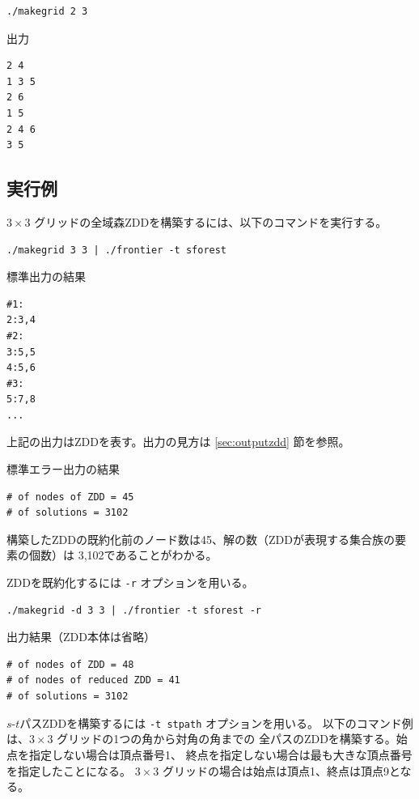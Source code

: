 \documentclass{jsarticle}
\begin{document}
\begin{verbatim}
./makegrid 2 3
\end{verbatim}

出力

\begin{verbatim}
2 4
1 3 5
2 6
1 5
2 4 6
3 5
\end{verbatim}

\subsection{実行例}

$3 \times 3$ グリッドの全域森ZDDを構築するには、以下のコマンドを実行する。

\begin{verbatim}
./makegrid 3 3 | ./frontier -t sforest
\end{verbatim}

標準出力の結果

\begin{verbatim}
#1:
2:3,4
#2:
3:5,5
4:5,6
#3:
5:7,8
...
\end{verbatim}

上記の出力はZDDを表す。出力の見方は \ref{sec:outputzdd} 節を参照。

標準エラー出力の結果

\begin{verbatim}
# of nodes of ZDD = 45
# of solutions = 3102
\end{verbatim}

構築したZDDの既約化前のノード数は45、解の数（ZDDが表現する集合族の要素の個数）は
3,102であることがわかる。

ZDDを既約化するには \texttt{-r} オプションを用いる。

\begin{verbatim}
./makegrid -d 3 3 | ./frontier -t sforest -r
\end{verbatim}

出力結果（ZDD本体は省略）

\begin{verbatim}
# of nodes of ZDD = 48
# of nodes of reduced ZDD = 41
# of solutions = 3102
\end{verbatim}

$s$-$t$パスZDDを構築するには \texttt{-t stpath} オプションを用いる。
以下のコマンド例は、$3 \times 3$ グリッドの1つの角から対角の角までの
全パスのZDDを構築する。始点を指定しない場合は頂点番号1、
終点を指定しない場合は最も大きな頂点番号を指定したことになる。
$3 \times 3$ グリッドの場合は始点は頂点1、終点は頂点9となる。
\end{document}
